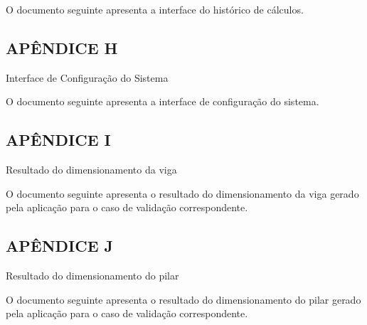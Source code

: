 O documento seguinte apresenta a interface do histórico de cálculos.



\newpage
{}
\begin{center}
\section*{APÊNDICE H}
Interface de Configuração do Sistema
\end{center}

O documento seguinte apresenta a interface de configuração do sistema.



\newpage
{}
\begin{center}
\section*{APÊNDICE I}
Resultado do dimensionamento da viga
\end{center}

O documento seguinte apresenta o resultado do dimensionamento da viga gerado pela aplicação para o caso de validação correspondente.



\newpage
{}
\begin{center}
\section*{APÊNDICE J}
Resultado do dimensionamento do pilar
\end{center}

O documento seguinte apresenta o resultado do dimensionamento do pilar gerado pela aplicação para o caso de validação correspondente.

